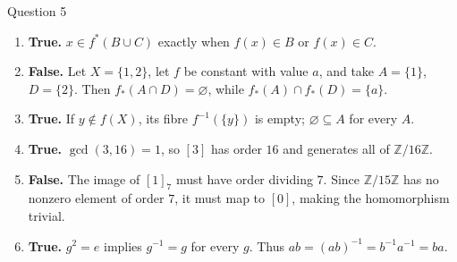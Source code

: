 \documentclass[11pt,a4paper]{article}
\newcommand{\Z}{\mathbb Z}
\begin{document}
\begin{worked}{Question 5}
\begin{enumerate}[label=(\alph*)]
\item \textbf{True.} $x\in f^*(B\cup C)$ exactly when $f(x)\in B$ or $f(x)\in C$.
\item \textbf{False.} Let $X=\{1,2\}$, let $f$ be constant with value $a$, and take $A=\{1\}$, $D=\{2\}$. Then $f_*(A\cap D)=\varnothing$, while $f_*(A)\cap f_*(D)=\{a\}$.
\item \textbf{True.} If $y\notin f(X)$, its fibre $f^{-1}(\{y\})$ is empty; $\varnothing\subseteq A$ for every $A$.
\item \textbf{True.} $\gcd(3,16)=1$, so $[3]$ has order $16$ and generates all of $\Z/16\Z$.
\item \textbf{False.} The image of $[1]_7$ must have order dividing $7$. Since $\Z/15\Z$ has no nonzero element of order $7$, it must map to $[0]$, making the homomorphism trivial.
\item \textbf{True.} $g^2=e$ implies $g^{-1}=g$ for every $g$. Thus $ab=(ab)^{-1}=b^{-1}a^{-1}=ba$.
\end{enumerate}
\end{worked}
\end{document}

